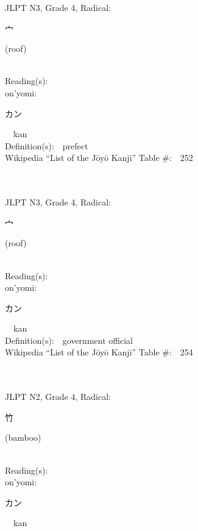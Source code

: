 \begin{multicols}{2}
{JLPT N3, Grade 4, Radical:\ \ {\begin{CJK}{UTF8}{min} 宀 \end{CJK}} (roof) } \\
Reading(s):\ \ \\
{\hspace*{1em}}on'yomi:\ \ \\
{\hspace*{2em}}{\begin{CJK}{UTF8}{min} カン \end{CJK}}\ \ kan\ \ \\
Definition(s):\ \ prefect \\
Wikipedia ``List of the J\=oy\=o Kanji'' Table \#:\ \ 252 \\
\ \ \\
{\fontsize{34pt}{40pt}  }\ \ \\  %
{JLPT N3, Grade 4, Radical:\ \ {\begin{CJK}{UTF8}{min} 宀 \end{CJK}} (roof) } \\
Reading(s):\ \ \\
{\hspace*{1em}}on'yomi:\ \ \\
{\hspace*{2em}}{\begin{CJK}{UTF8}{min} カン \end{CJK}}\ \ kan\ \ \\
Definition(s):\ \ government official \\
Wikipedia ``List of the J\=oy\=o Kanji'' Table \#:\ \ 254 \\
\ \ \\
{\fontsize{34pt}{40pt}  }\ \ \\  %
{JLPT N2, Grade 4, Radical:\ \ {\begin{CJK}{UTF8}{min} 竹 \end{CJK}} (bamboo) } \\
Reading(s):\ \ \\
{\hspace*{1em}}on'yomi:\ \ \\
{\hspace*{2em}}{\begin{CJK}{UTF8}{min} カン \end{CJK}}\ \ kan\ \ \\

\end{multicols}
